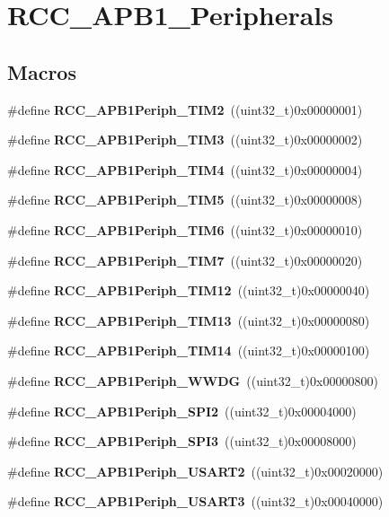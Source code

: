\section{R\+C\+C\+\_\+\+A\+P\+B1\+\_\+\+Peripherals}
\label{group__RCC__APB1__Peripherals}
\subsection*{Macros}
\begin{DoxyCompactItemize}
\item 
\#define \textbf{ R\+C\+C\+\_\+\+A\+P\+B1\+Periph\+\_\+\+T\+I\+M2}~((uint32\+\_\+t)0x00000001)
\item 
\#define \textbf{ R\+C\+C\+\_\+\+A\+P\+B1\+Periph\+\_\+\+T\+I\+M3}~((uint32\+\_\+t)0x00000002)
\item 
\#define \textbf{ R\+C\+C\+\_\+\+A\+P\+B1\+Periph\+\_\+\+T\+I\+M4}~((uint32\+\_\+t)0x00000004)
\item 
\#define \textbf{ R\+C\+C\+\_\+\+A\+P\+B1\+Periph\+\_\+\+T\+I\+M5}~((uint32\+\_\+t)0x00000008)
\item 
\#define \textbf{ R\+C\+C\+\_\+\+A\+P\+B1\+Periph\+\_\+\+T\+I\+M6}~((uint32\+\_\+t)0x00000010)
\item 
\#define \textbf{ R\+C\+C\+\_\+\+A\+P\+B1\+Periph\+\_\+\+T\+I\+M7}~((uint32\+\_\+t)0x00000020)
\item 
\#define \textbf{ R\+C\+C\+\_\+\+A\+P\+B1\+Periph\+\_\+\+T\+I\+M12}~((uint32\+\_\+t)0x00000040)
\item 
\#define \textbf{ R\+C\+C\+\_\+\+A\+P\+B1\+Periph\+\_\+\+T\+I\+M13}~((uint32\+\_\+t)0x00000080)
\item 
\#define \textbf{ R\+C\+C\+\_\+\+A\+P\+B1\+Periph\+\_\+\+T\+I\+M14}~((uint32\+\_\+t)0x00000100)
\item 
\#define \textbf{ R\+C\+C\+\_\+\+A\+P\+B1\+Periph\+\_\+\+W\+W\+DG}~((uint32\+\_\+t)0x00000800)
\item 
\#define \textbf{ R\+C\+C\+\_\+\+A\+P\+B1\+Periph\+\_\+\+S\+P\+I2}~((uint32\+\_\+t)0x00004000)
\item 
\#define \textbf{ R\+C\+C\+\_\+\+A\+P\+B1\+Periph\+\_\+\+S\+P\+I3}~((uint32\+\_\+t)0x00008000)
\item 
\#define \textbf{ R\+C\+C\+\_\+\+A\+P\+B1\+Periph\+\_\+\+U\+S\+A\+R\+T2}~((uint32\+\_\+t)0x00020000)
\item 
\#define \textbf{ R\+C\+C\+\_\+\+A\+P\+B1\+Periph\+\_\+\+U\+S\+A\+R\+T3}~((uint32\+\_\+t)0x00040000)
\item 

\end{DoxyCompactItemize}
